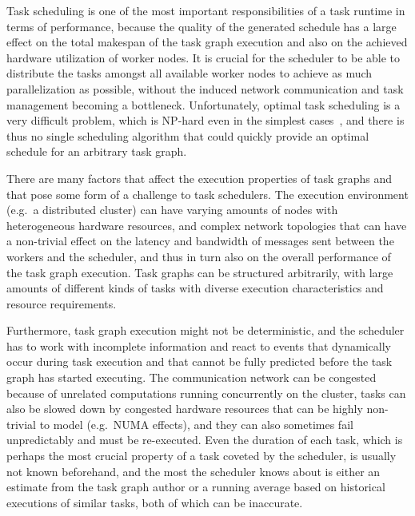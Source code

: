 
Task scheduling is one of the most important responsibilities of a task runtime in terms of
performance, because the quality of the generated schedule has a large effect on the total makespan
of the task graph execution and also on the achieved hardware utilization of worker nodes. It is
crucial for the scheduler to be able to distribute the tasks amongst all available worker nodes to
achieve as much parallelization as possible, without the induced network communication and task
management becoming a bottleneck. Unfortunately, optimal task scheduling is a very difficult
problem, which is NP-hard even in the simplest cases~\cite{Ullman1975}, and there is thus no
single scheduling algorithm that could quickly provide an optimal schedule for an arbitrary task
graph.

There are many factors that affect the execution properties of task graphs and that pose some form
of a challenge to task schedulers. The execution environment (e.g.\ a distributed cluster) can have
varying amounts of nodes with heterogeneous hardware resources, and complex network topologies that
can have a non-trivial effect on the latency and bandwidth of messages sent between the workers and
the scheduler, and thus in turn also on the overall performance of the task graph execution. Task
graphs can be structured arbitrarily, with large amounts of different kinds of tasks with diverse
execution characteristics and resource requirements.

Furthermore, task graph execution might not be deterministic, and the scheduler has to work with
incomplete information and react to events that dynamically occur during task execution and that
cannot be fully predicted before the task graph has started executing. The communication network
can be congested because of unrelated computations running concurrently on the cluster, tasks can
also be slowed down by congested hardware resources that can be highly non-trivial to model (e.g.\
NUMA effects), and they can also sometimes fail unpredictably and must be re-executed. Even the
duration of each task, which is perhaps the most crucial property of a task coveted by the
scheduler, is usually not known beforehand, and the most the scheduler knows about is either an
estimate from the task graph author or a running average based on historical executions of similar
tasks, both of which can be inaccurate.

